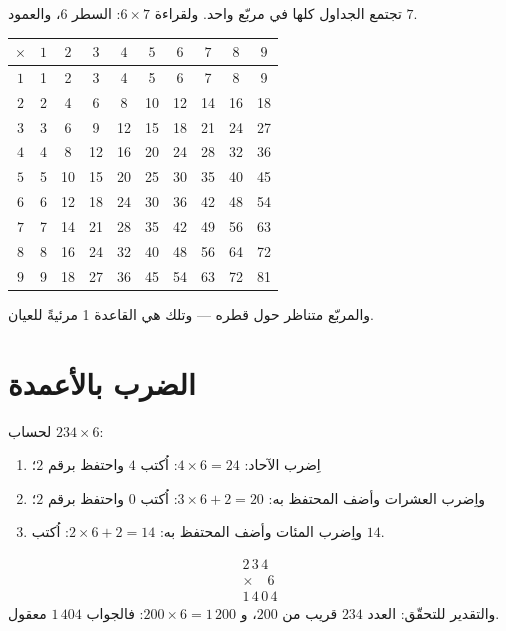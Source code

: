 \begin{example}\label{ex:g3:mult:table}
تجتمع الجداول كلها في مربّع واحد. ولقراءة $6 \times 7$: السطر
$6$، والعمود $7$.
\begin{center}
\renewcommand{\arraystretch}{1.15}
\begin{tabular}{c|ccccccccc}
$\times$ & $1$ & $2$ & $3$ & $4$ & $5$ & $6$ & $7$ & $8$ & $9$ \\
\hline
$1$ & 1 & 2 & 3 & 4 & 5 & 6 & 7 & 8 & 9 \\
$2$ & 2 & 4 & 6 & 8 & 10 & 12 & 14 & 16 & 18 \\
$3$ & 3 & 6 & 9 & 12 & 15 & 18 & 21 & 24 & 27 \\
$4$ & 4 & 8 & 12 & 16 & 20 & 24 & 28 & 32 & 36 \\
$5$ & 5 & 10 & 15 & 20 & 25 & 30 & 35 & 40 & 45 \\
$6$ & 6 & 12 & 18 & 24 & 30 & 36 & 42 & 48 & 54 \\
$7$ & 7 & 14 & 21 & 28 & 35 & 42 & 49 & 56 & 63 \\
$8$ & 8 & 16 & 24 & 32 & 40 & 48 & 56 & 64 & 72 \\
$9$ & 9 & 18 & 27 & 36 & 45 & 54 & 63 & 72 & 81 \\
\end{tabular}
\end{center}
والمربّع متناظر حول قطره --- وتلك هي القاعدة 1 مرئيةً
للعيان.
\end{example}

\section{الضرب بالأعمدة}

\begin{method}\label{met:g3:mult:column}
لحساب $234 \times 6$:
\begin{enumerate}
  \item اِضرب الآحاد: $4 \times 6 = 24$: اُكتب $4$ واحتفظ برقم $2$؛
  \item واِضرب العشرات وأضف المحتفظ به:
        $3 \times 6 + 2 = 20$: اُكتب $0$ واحتفظ برقم $2$؛
  \item واِضرب المئات وأضف المحتفظ به:
        $2 \times 6 + 2 = 14$: اُكتب $14$.
\end{enumerate}
\[
\begin{array}{r}
2\,3\,4 \\
\times \quad 6 \\
\hline
1\,4\,0\,4
\end{array}
\]
والتقدير للتحقّق: العدد $234$ قريب من $200$، و
$200 \times 6 = 1\,200$: فالجواب $1\,404$ معقول.
\end{method}

